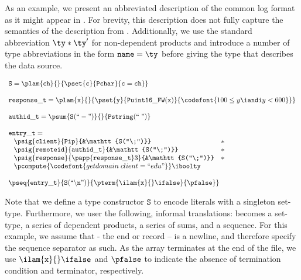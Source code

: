 As an example, we present an abbreviated description of the common log
format as it might appear in \ddc{}. For brevity,
this description does not fully capture the semantics of the
\ipads{} description from . Additionally, we
use the standard abbreviation $\ty * \ty'$ for non-dependent products and introduce a number of type abbreviations
in the form $\mathtt{name} = \ty$ before giving the type that describes the data source.

\[
\begin{array}{l}
\mathtt{S} = \plam {\mathtt{ch}} {} {\pset {\mathtt{c}}
  {\mathtt{Pchar}} {\mathtt{c = ch}}}\\
\\
\mathtt{response\_t} = \plam {\mathtt x} {} {
      \pset {\mathtt y} {\mathtt{Puint16\_FW(x)}} 
      {\codefont{100 \leq y \iandi y < 600}}
    }\\
\\
\mathtt{authid\_t} = 
\psum {\mathtt{S(``-")}} {} {\mathtt{Pstring(``\;")}}\\
\\
\mathtt{entry\_t} = \\ \;
\begin{array}{lll}
\psig {\mathtt{client}} {\mathtt{Pip}} {&\mathtt{S(``\;")}} &* \\
\psig {\mathtt{remoteid}} {\mathtt{authid\_t}} {&\mathtt{S(``\;")}} &* \\
\psig {\mathtt{response}} {
  \papp
    {\mathtt{response\_t}} 3
}{&\mathtt{S(``\;")}} &*\\
\multicolumn{3}{c}{
\pcompute {\codefont{getdomain\;client = ``edu"}} \iboolty}
\end{array}\\
\\
\pseq {\mathtt{entry\_t}} {\mathtt{S(``\backslash n")}}{
  \pterm {\ilam {\mathtt x} {} \ifalse} {\pfalse}
}
\end{array}
\]

Note that we define a type constructor $\mathtt{S}$ to encode literals
with a singleton set-type. Furthermore, we user the following,
informal translations:\Pwhere{} becomes a set-type, \Pstruct{} a
series of dependent products, \Punion{} a series of sums, and
\Parray{} a sequence. For this example, we assume that \Peor{} - the
end or record -- is a newline, and therefore specify the sequence
separator as such. As the array terminates at the end of the file, we
use $\ilam {\mathtt x} {} \ifalse$ and $\pfalse$ to indicate the
absence of termination condition and terminator, respectively.

